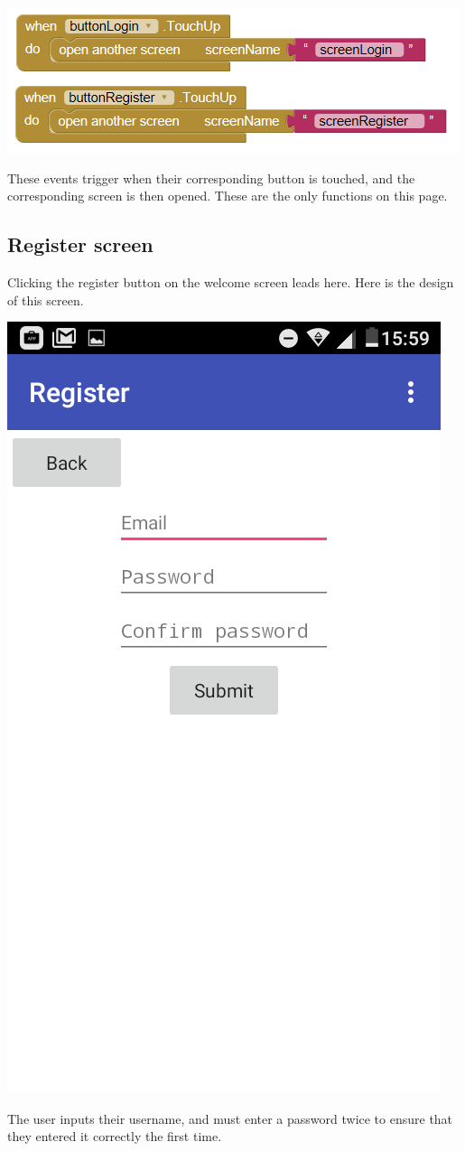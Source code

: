 \documentclass{scrreprt}
\begin{document}
\begin{center}
    \includegraphics[width=0.75\linewidth]{images/welcomeCode.png}
\end{center}

These events trigger when their corresponding button is touched, and the corresponding screen is then opened. These are the only functions on this page.

\subsection{Register screen}

Clicking the register button on the welcome screen leads here. Here is the design of this screen.

\begin{center}
    \includegraphics[width=0.5\linewidth]{images/registerDesign.png}
\end{center}

The user inputs their username, and must enter a password twice to ensure that they entered it correctly the first time.
\end{document}
